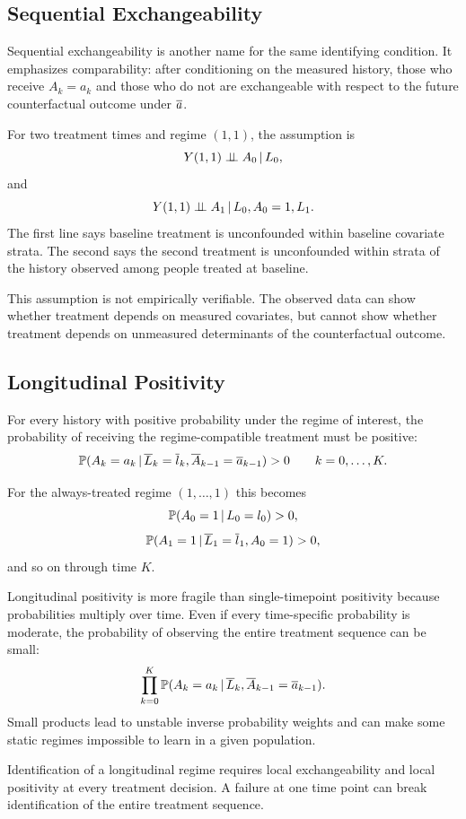 \subsection{Sequential Exchangeability}

Sequential exchangeability is another name for the same identifying condition.
It emphasizes comparability: after conditioning on the measured history, those
who receive $A_k=a_k$ and those who do not are exchangeable with respect to the
future counterfactual outcome under $\overline{a}$.

For two treatment times and regime $(1,1)$, the assumption is
\[
  Y(1,1) \perp\!\!\!\perp A_0 \,\vert\, L_0,
\]
and
\[
  Y(1,1) \perp\!\!\!\perp A_1 \,\vert\, L_0,A_0=1,L_1.
\]
The first line says baseline treatment is unconfounded within baseline covariate
strata. The second says the second treatment is unconfounded within strata of
the history observed among people treated at baseline.

This assumption is not empirically verifiable. The observed data can show
whether treatment depends on measured covariates, but cannot show whether
treatment depends on unmeasured determinants of the counterfactual outcome.

\subsection{Longitudinal Positivity}

\begin{assumptionbox}
For every history with positive probability under the regime of interest,
the probability of receiving the regime-compatible treatment must be positive:
\[
  \mathbb{P}(A_k=a_k \,\vert\, \overline{L}_k=\overline{l}_k,\overline{A}_{k-1}=\overline{a}_{k-1})>0
  \qquad k=0,\ldots,K.
\]
\end{assumptionbox}

For the always-treated regime $(1,\ldots,1)$ this becomes
\[
  \mathbb{P}(A_0=1\,\vert\, L_0=l_0)>0,
\]
\[
  \mathbb{P}(A_1=1\,\vert\, \overline{L}_1=\overline{l}_1,A_0=1)>0,
\]
and so on through time $K$.

Longitudinal positivity is more fragile than single-timepoint positivity because
probabilities multiply over time. Even if every time-specific probability is
moderate, the probability of observing the entire treatment sequence can be
small:
\[
  \prod_{k=0}^K
  \mathbb{P}(A_k=a_k\,\vert\, \overline{L}_k,\overline{A}_{k-1}=\overline{a}_{k-1}).
\]
Small products lead to unstable inverse probability weights and can make some
static regimes impossible to learn in a given population.

\begin{keyidea}
Identification of a longitudinal regime requires local exchangeability and local
positivity at every treatment decision. A failure at one time point can break
identification of the entire treatment sequence.
\end{keyidea}

